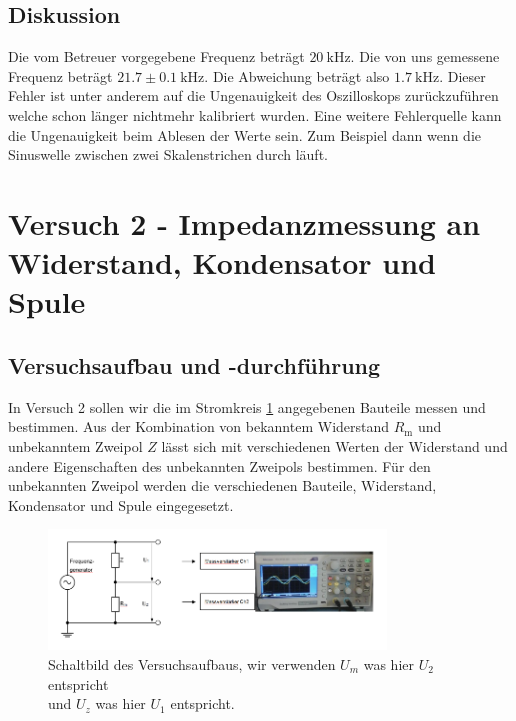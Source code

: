     \subsection{Diskussion}

    Die vom Betreuer vorgegebene Frequenz beträgt $20\ \mathrm{kHz}$. Die von uns gemessene Frequenz beträgt $21.7 \pm 0.1\ \mathrm{kHz}$. Die Abweichung beträgt also $1.7\ \mathrm{kHz}$. Dieser Fehler ist unter anderem auf die Ungenauigkeit des Oszilloskops zurückzuführen welche schon länger nichtmehr kalibriert wurden. Eine weitere Fehlerquelle kann die Ungenauigkeit beim Ablesen der Werte sein. Zum Beispiel dann wenn die Sinuswelle zwischen zwei Skalenstrichen durch läuft.
    
\section{Versuch 2 - Impedanzmessung an Widerstand, Kondensator und Spule}
    
    \subsection{Versuchsaufbau und -durchführung}
        
        In Versuch 2 sollen wir die im Stromkreis \ref{fig:Versuch2_Schaltbild} angegebenen Bauteile messen und bestimmen. Aus der Kombination von bekanntem Widerstand $R_{\mathrm{m}}$ und unbekanntem Zweipol $Z$ lässt sich mit verschiedenen Werten der Widerstand und andere Eigenschaften des unbekannten Zweipols bestimmen. Für den unbekannten Zweipol werden die verschiedenen Bauteile, Widerstand, Kondensator und Spule eingegesetzt.

        \begin{figure}[H]
            \centering
            \includegraphics[width=0.8\textwidth]{bilder/Versuch2_Aufbau.png}
            \caption{Schaltbild des Versuchsaufbaus, wir verwenden $U_m$ was hier $U_2$ entspricht \\ und $U_z$ was hier $U_1$ entspricht.}
            \label{fig:Versuch2_Schaltbild}
        \end{figure}

